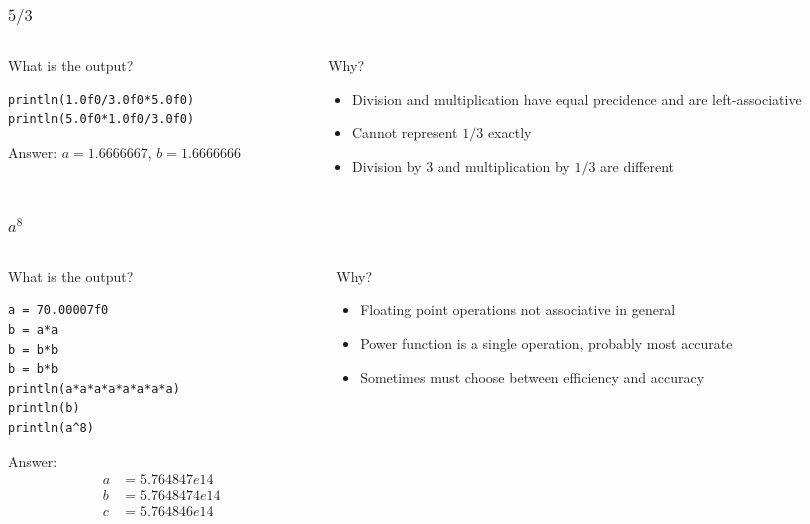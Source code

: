 \documentclass[aspectratio=169,hyperref={bookmarks=false,urlcolor=blue,colorlinks=true},10pt]{beamer}
\begin{document}
\begin{frame}[fragile]
  \frametitle{$5/3$}

  \begin{columns}[t]
    \begin{column}{0.45\textwidth}
      What is the output?

      \begin{lstlisting}
println(1.0f0/3.0f0*5.0f0)
println(5.0f0*1.0f0/3.0f0)
      \end{lstlisting}

      \pause

      Answer: $a=1.6666667$, $b=1.6666666$
    \end{column}
    \begin{column}{0.45\textwidth}
      Why?

      \pause

      \begin{itemize}
      \item Division and multiplication have equal precidence and are left-associative
      \item Cannot represent $1/3$ exactly
      \item Division by 3 and multiplication by $1/3$ are different
      \end{itemize}
    \end{column}
  \end{columns}
\end{frame}

\begin{frame}[fragile]
  \frametitle{$a^8$}

  \begin{columns}[t]
    \begin{column}{0.45\textwidth}
      What is the output?

      \begin{lstlisting}
a = 70.00007f0
b = a*a
b = b*b
b = b*b
println(a*a*a*a*a*a*a*a)
println(b)
println(a^8)
      \end{lstlisting}

      \pause

      Answer:
      \begin{align*}
        a &= 5.764847e14\\
        b &= 5.7648474e14\\
        c &= 5.764846e14
      \end{align*}
    \end{column}
    \begin{column}{0.45\textwidth}
      Why?

      \pause

      \begin{itemize}
      \item Floating point operations not associative in general
      \item Power function is a single operation, probably most accurate
      \item Sometimes must choose between efficiency and accuracy
      \end{itemize}
    \end{column}
  \end{columns}
\end{frame}
\end{document}
